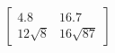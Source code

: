 \documentclass{article}
\begin{document}
	\begin{equation}
		\left[
		\begin{matrix}
			4.8 & 16.7\\ 12\sqrt{8} & 16\sqrt{87}
		\end{matrix}
	    \right]
	\end{equation}
\end{document}
